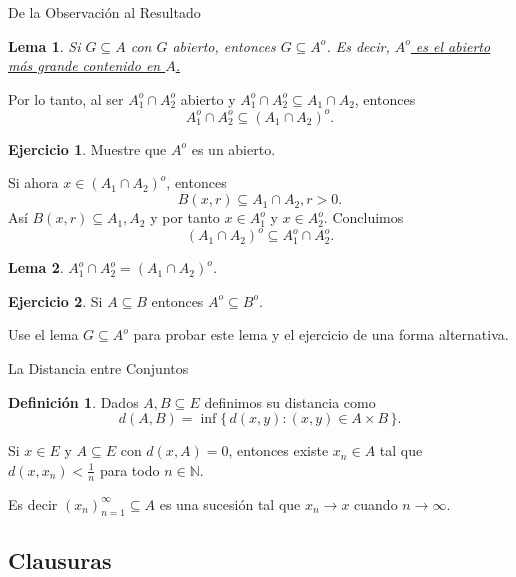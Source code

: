 \documentclass[utf8]{beamer}
\theoremstyle{plain}
\newtheorem{Lem}{Lema}                 %
\theoremstyle{definition}
\newtheorem{Def}{Definición}           %
\newtheorem{Ej}{Ejercicio}             %
\theoremstyle{remark}
\numberwithin{equation}{section}
\newcommand{\bN}{\mathbb{N}}    %
\newcommand{\set}[1]{\{\,#1\,\}}    %
\begin{document}
\begin{frame}{De la Observación al Resultado}
    \begin{Lem}
        Si $G\subseteq A$ con $G$ abierto, entonces $G\subseteq A^o$. Es decir, \underline{$A^o$ es el abierto m\'as grande contenido en $A$.}
    \end{Lem}
    Por lo tanto, al ser $A_1^o\cap A_2^o$ abierto y $A_1^o\cap A_2^o\subseteq A_1\cap A_2$, entonces
    $$A_1^o\cap A_2^o\subseteq(A_1\cap A_2)^o.$$
    \begin{Ej}\label{ej:interiorAbierto}
        Muestre que $A^o$ es un abierto.
    \end{Ej}
\end{frame}

\begin{frame}
    Si ahora $x\in(A_1\cap A_2)^o$, entonces 
    $$B(x,r)\subseteq A_1\cap A_2, r>0.$$
    As\'i $B(x,r)\subseteq A_1,A_2$ y por tanto $x\in A_1^o$ y $x\in A_2^o$. Concluimos 
    $$(A_1\cap A_2)^o\subseteq A_1^o\cap A_2^o.$$
    \begin{Lem}
        $A_1^o\cap A_2^o=(A_1\cap A_2)^o$.
    \end{Lem}
    \begin{Ej}\label{ej:interiorRespetaSubconj}
        Si $A\subseteq B$ entonces $A^o\subseteq B^o$.
    \end{Ej}
    \alert{Use el lema $G\subseteq A^o$ para probar este lema y el ejercicio de una forma alternativa.}
\end{frame}

\begin{frame}{La Distancia entre Conjuntos}
    \begin{Def}
        Dados $A,B\subseteq E$ definimos su distancia como
        $$d(A,B) = \inf\set{d(x,y): (x,y)\in A\times B}.$$
      \end{Def}
      Si $x\in E$ y $A\subseteq E$ con $d(x,A)=0$, entonces existe $x_n\in A$ tal que $d(x,x_n)<\frac1n$ para todo $n\in\bN$.\par 
      Es decir $(x_n)_{n=1}^\infty\subseteq A$ es una sucesión tal que $x_n\to x$ cuando $n\to \infty$.
      
\end{frame}

\subsection{Clausuras}
\end{document}
